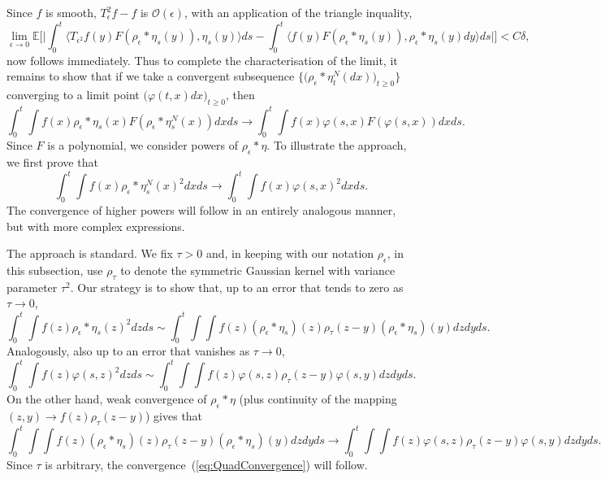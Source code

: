 \documentclass[12pt]{article}
\newcommand{\IE}{\mathbb E}
\numberwithin{equation}{section}
\begin{document}

Since $f$ is smooth, $T_\epsilon^2f-f$ is ${\mathcal O}(\epsilon)$, 
with an application of the triangle inquality, 
\[
\lim_{\epsilon\to 0}\IE\Big[\Big|\int_0^t\big\langle T_{\epsilon^2} f(y) 
F(\rho_\epsilon *\eta_s(y)), \eta_s(y) \big\rangle ds 
- \int_0^t\big\langle f(y) 
F(\rho_\epsilon * \eta_s(y)), \rho_\epsilon * \eta_s(y) dy 
\big\rangle ds\Big|\Big]
<C\delta,
\]
now follows immediately.
Thus to complete the characterisation of the limit, 
it remains to show that if we
take a convergent subsequence 
$\big\{\big(\rho_\epsilon*\eta_t^N(dx)\big)_{t\geq 0}\big\}$ 
converging to a limit point $\big(\varphi(t,x)dx\big)_{t\geq 0}$, then
\[ 
\int_0^t
\int f(x) \rho_\epsilon * \eta_s(x) F(\rho_\epsilon * \eta_s^N(x)) dx ds 
\rightarrow \int_0^t\int f(x) \varphi(s,x) F(\varphi(s,x)) dx ds. 
\]
Since $F$ is a polynomial, we consider powers of $\rho_\epsilon*\eta$.
To illustrate the approach, we first prove that
\begin{equation} 
\label{eq:QuadConvergence} 
\int_0^t\int f(x) 
\rho_\epsilon * \eta_s^N(x)^2 dx ds
\rightarrow \int_0^t \int f(x) 
\varphi(s,x)^2 dx ds. 
\end{equation}
The convergence of higher powers will follow in an entirely analogous manner, but
with more complex expressions.

The approach is standard. We fix $\tau>0$ and, in keeping with
our notation $\rho_\epsilon$, in this subsection, use $\rho_\tau$ to 
denote the symmetric Gaussian kernel with variance parameter $\tau^2$.
Our strategy is to show that, up to an error that tends
to zero as $\tau \to 0$, 
\begin{equation}
\label{approx2}
\int_0^t\int f(z) \rho_\epsilon*\eta_s(z)^2 dz ds
\sim 
\int_0^t\int \int f(z) (\rho_\epsilon * \eta_s)(z) 
\rho_\tau (z-y) (\rho_\epsilon * \eta_s)(y) dz dy ds.
\end{equation}
Analogously, also up to an error that vanishes as $\tau \to 0$,
\begin{equation}
\label{approx3}
\int_0^t\int f(z) \varphi(s,z)^2 dz ds
\sim 
\int_0^t\int \int f(z) \varphi(s,z) 
\rho_\tau (z-y) \varphi(s,y) dz dy ds.
\end{equation}
On the other hand,
weak convergence of $\rho_\epsilon * \eta$ 
(plus continuity of the mapping $(z,y) \rightarrow f(z) \rho_\tau(z-y)$) 
gives that 
\begin{equation}
\int_0^t\int \int f(z) (\rho_\epsilon * \eta_s)(z) 
\rho_\tau (z-y) (\rho_\epsilon * \eta_s)(y) dz dy ds
\to \int_0^t \int \int f(z) \varphi(s,z) 
\rho_\tau (z-y) \varphi(s,y) dz dy ds.
\end{equation}
Since $\tau$ is arbitrary, the 
convergence~(\ref{eq:QuadConvergence})
will follow.
\end{document}
